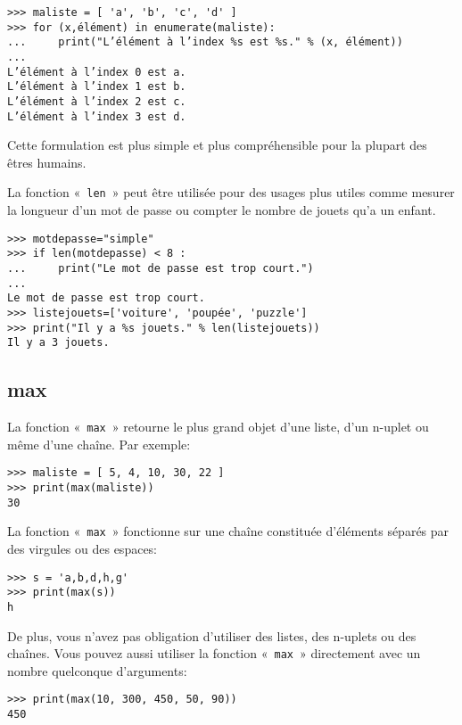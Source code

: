 \begin{Verbatim}[frame=single,rulecolor=\color{green}]
>>> maliste = [ 'a', 'b', 'c', 'd' ]
>>> for (x,élément) in enumerate(maliste):
...     print("L’élément à l’index %s est %s." % (x, élément))
... 
L’élément à l’index 0 est a.
L’élément à l’index 1 est b.
L’élément à l’index 2 est c.
L’élément à l’index 3 est d.
\end{Verbatim}

Cette formulation est plus simple et plus compréhensible pour la plupart des êtres humains.

La fonction «~\texttt{len}~» peut être utilisée pour des usages plus utiles comme mesurer la longueur d'un mot de passe ou compter le nombre de jouets qu'a un enfant.

\begin{Verbatim}[frame=single,rulecolor=\color{gray}]
>>> motdepasse="simple"
>>> if len(motdepasse) < 8 :
...     print("Le mot de passe est trop court.")
...
Le mot de passe est trop court.
>>> listejouets=['voiture', 'poupée', 'puzzle']
>>> print("Il y a %s jouets." % len(listejouets))
Il y a 3 jouets.
\end{Verbatim} 

\subsection*{max}

La fonction «~\texttt{max}~» retourne le plus grand objet d'une liste,  d'un n-uplet ou même d'une chaîne. Par exemple:

\begin{Verbatim}[frame=single,rulecolor=\color{gray}]
>>> maliste = [ 5, 4, 10, 30, 22 ]
>>> print(max(maliste))
30
\end{Verbatim}

La fonction «~\texttt{max}~» fonctionne sur une chaîne constituée d'éléments séparés par des virgules ou des espaces:
\begin{Verbatim}[frame=single,rulecolor=\color{gray}]
>>> s = 'a,b,d,h,g'
>>> print(max(s))
h
\end{Verbatim}

De plus, vous n'avez pas obligation d'utiliser des listes, des n-uplets ou des chaînes. Vous pouvez aussi utiliser la fonction «~\texttt{max}~» directement avec un nombre quelconque d'arguments:
\begin{Verbatim}[frame=single,rulecolor=\color{gray}]
>>> print(max(10, 300, 450, 50, 90))
450
\end{Verbatim}

